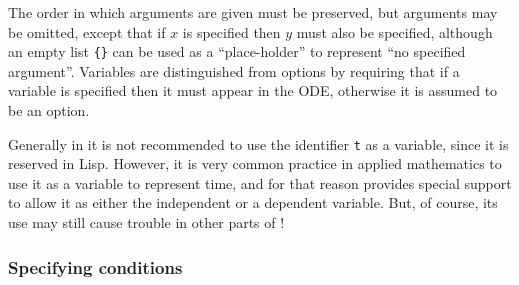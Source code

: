 The order in which arguments are given must be preserved, but
arguments may be omitted, except that if $x$ is specified then $y$
must also be specified, although an empty list \verb|{}| can be used
as a ``place-holder'' to represent ``no specified argument''.
Variables are distinguished from options by requiring that if a
variable is specified then it must appear in the ODE, otherwise it is
assumed to be an option.

Generally in \REDUCE{} it is not recommended to use the identifier
\verb|t| as a variable, since it is reserved in Lisp.  However, it is
very common practice in applied mathematics to use it as a variable to
represent time, and for that reason  provides special
support to allow it as either the independent or a dependent variable.
But, of course, its use may still cause trouble in other parts of
\REDUCE!


\subsubsection{Specifying conditions}

